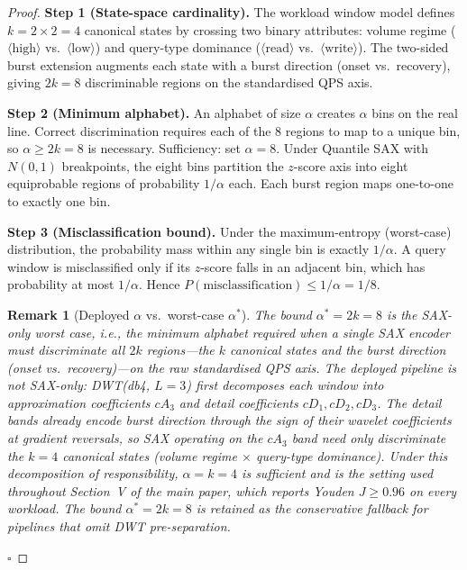 \documentclass[10pt,twocolumn,a4paper]{article}
\newtheorem{remark}{Remark}
\begin{document}
\begin{proof}
\textbf{Step 1 (State-space cardinality).}
The workload window model defines $k=2\times2=4$ canonical states by
crossing two binary attributes: volume regime
($\langle\mathrm{high}\rangle$ vs.\ $\langle\mathrm{low}\rangle$) and
query-type dominance ($\langle\mathrm{read}\rangle$ vs.\
$\langle\mathrm{write}\rangle$). The two-sided burst extension augments
each state with a burst direction (onset vs.\ recovery), giving
$2k=8$ discriminable regions on the standardised QPS axis.

\textbf{Step 2 (Minimum alphabet).}
An alphabet of size $\alpha$ creates $\alpha$ bins on the real line.
Correct discrimination requires each of the 8 regions to map to a
unique bin, so $\alpha\geq2k=8$ is necessary. Sufficiency: set
$\alpha=8$. Under Quantile SAX with $N(0,1)$ breakpoints, the eight
bins partition the $z$-score axis into eight equiprobable regions of
probability $1/\alpha$ each. Each burst region maps one-to-one to
exactly one bin.

\textbf{Step 3 (Misclassification bound).}
Under the maximum-entropy (worst-case) distribution, the probability
mass within any single bin is exactly $1/\alpha$. A query window is
misclassified only if its $z$-score falls in an adjacent bin, which
has probability at most $1/\alpha$. Hence
$P(\mathrm{misclassification})\leq1/\alpha=1/8$.

\begin{remark}[Deployed $\alpha$ vs.\ worst-case $\alpha^{*}$]
The bound $\alpha^{*}=2k=8$ is the \emph{SAX-only} worst case, i.e.,
the minimum alphabet required when a single SAX encoder must
discriminate all $2k$ regions---the $k$ canonical states \emph{and}
the burst direction (onset vs.\ recovery)---on the raw standardised
QPS axis. The deployed pipeline is not SAX-only: DWT(db4, $L\!=\!3$)
first decomposes each window into approximation coefficients $cA_3$
and detail coefficients $cD_1, cD_2, cD_3$. The detail bands already
encode burst direction through the sign of their wavelet coefficients
at gradient reversals, so SAX operating on the $cA_3$ band need only
discriminate the $k=4$ canonical states (volume regime $\times$
query-type dominance). Under this decomposition of responsibility,
$\alpha=k=4$ is sufficient and is the setting used throughout
Section~V of the main paper, which reports Youden $J\geq0.96$ on
every workload. The bound $\alpha^{*}=2k=8$ is retained as the
conservative fallback for pipelines that omit DWT pre-separation.
\end{remark}
\hfill$\square$
\end{proof}
\end{document}
